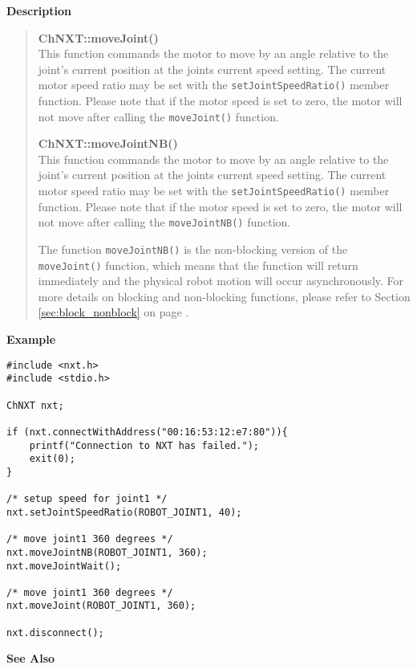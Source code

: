 \noindent
{\bf Description}\\
\vspace{-12pt}
\begin{quote}
{\bf ChNXT::moveJoint()}\\
This function commands the motor to move by an angle relative to 
the joint's current position at the joints current speed setting.
The current motor speed ratio may be set with the 
\texttt{setJointSpeedRatio()} member function. Please note that if
the motor speed is set to zero, the motor will not move after 
calling the \texttt{moveJoint()} function. 

{\bf ChNXT::moveJointNB()}\\
This function commands the motor to move by an angle relative to 
the joint's current position at the joints current speed setting.
The current motor speed ratio may be set with the
\texttt{setJointSpeedRatio()} member function. Please note that if
the motor speed is set to zero, the motor will not move after 
calling the \texttt{moveJointNB()} function. 

The function \texttt{moveJointNB()} is the non-blocking version of
the \texttt{moveJoint()} function, which means that the function 
will return immediately and the physical robot motion will occur 
asynchronously. For more details on blocking and non-blocking 
functions, please refer to Section \ref{sec:block_nonblock} on page 
\pageref{sec:block_nonblock}.\\
\end{quote}

\noindent
{\bf Example}
\begin{verbatim}
#include <nxt.h> 
#include <stdio.h>

ChNXT nxt;

if (nxt.connectWithAddress("00:16:53:12:e7:80")){
    printf("Connection to NXT has failed.");
    exit(0);
}
 
/* setup speed for joint1 */
nxt.setJointSpeedRatio(ROBOT_JOINT1, 40);

/* move joint1 360 degrees */
nxt.moveJointNB(ROBOT_JOINT1, 360);
nxt.moveJointWait();

/* move joint1 360 degrees */
nxt.moveJoint(ROBOT_JOINT1, 360);

nxt.disconnect();
\end{verbatim}

\noindent
{\bf See Also}\\

